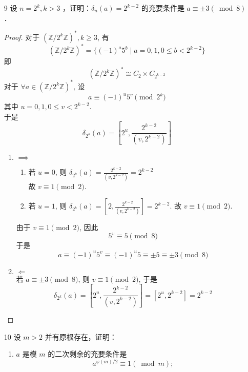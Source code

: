 \begin{enumerate}
\begin{proof}
\begin{enumerate}
        \item {}$\Longleftarrow$ \\
        若 $a \equiv -1 \pmod p$, 则
        \[ a^2 \equiv 1 \pmod p \]
        故
        \[ \delta_p(a)=2 \]
    \end{enumerate}
\end{proof}
    
    \item[9] 设 $n=2^k, k > 3$ ，证明：$\delta_n(a)=2^{k-2}$ 的充要条件是 $a \equiv \pm 3(\bmod 8)$ ．

\begin{proof}
    对于 $(\mathbb{Z}/2^k\mathbb{Z})^*, k \ge 3$, 有
    \[ (\mathbb{Z}/2^k\mathbb{Z})^* = \{(-1)^a 5^b \mid a=0,1, 0 \le b < 2^{k-2}\} \]
    即
    \[ (\mathbb{Z}/2^k\mathbb{Z})^* \cong C_2 \times C_{2^{k-2}} \]
    对于 $\forall a \in (\mathbb{Z}/2^k\mathbb{Z})^*$, 设
    \[ a \equiv (-1)^u 5^v \pmod{2^k} \]
    其中 $u=0,1, 0 \le v < 2^{k-2}$. \\
    于是
    \[ \delta_{2^k}(a) = \left[2^u, \frac{2^{k-2}}{(v, 2^{k-2})}\right] \]
    \begin{enumerate}
        \item {}$\implies$ \\
        \begin{enumerate}
            \item 若 $u=0$, 则 $\delta_{2^k}(a) = \frac{2^{k-2}}{(v, 2^{k-2})} = 2^{k-2}$ \\
            故 $v \equiv 1 \pmod 2$. 
            \item 若 $u=1$, 则 $\delta_{2^k}(a) = \left[2, \frac{2^{k-2}}{(v, 2^{k-2})}\right] = 2^{k-2}.$ 
            故 $v \equiv 1 \pmod 2$.
        \end{enumerate}
        由于 $v \equiv 1 \pmod 2$, 因此
        \[ 5^v \equiv 5 \pmod 8 \]
        于是
        \[ a \equiv (-1)^u 5^v \equiv (-1)^u 5 \equiv \pm 5 \equiv \pm 3 \pmod 8 \]
        \item {}$\Longleftarrow$ \\
        若 $a \equiv \pm 3 \pmod 8$, 则 $v \equiv 1 \pmod 2$, 于是
        \[ \delta_{2^k}(a) = \left[2^u, \frac{2^{k-2}}{(v, 2^{k-2})}\right] = \left[2^u, 2^{k-2}\right] = 2^{k-2} \]
    \end{enumerate}
    
\end{proof}

    \item[10] 设 $m>2$ 并有原根存在，证明：
\begin{enumerate}
    \item $a$ 是模 $m$ 的二次剩余的充要条件是
$$
a^{\varphi(m) / 2} \equiv 1(\bmod m) ;
$$


\end{enumerate}
\end{enumerate}
